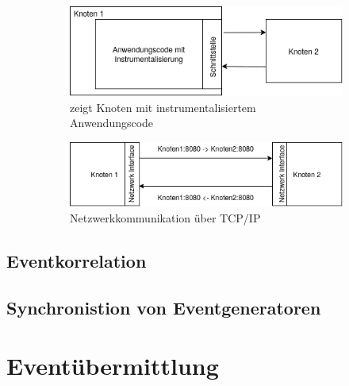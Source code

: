 \begin{figure}[!ht]
	\centering
	\begin{subfigure}[t]{.49\linewidth}
		\centering\includegraphics[width=0.9\linewidth]{img/synchronisation/distributed_system_application_inside.png}
		\caption[Abbildung]{zeigt Knoten mit instrumentalisiertem Anwendungscode}
		\label{fig:distributed_system_application_inside}
	\end{subfigure}
	\begin{subfigure}[t]{.49\linewidth}
		\centering\includegraphics[width=\linewidth]{img/synchronisation/distributed_system_network.png}
		\caption[Abbildung]{Netzwerkkommunikation über TCP/IP}
		\label{fig:distributed_system_network}
	\end{subfigure}
	\caption[Anwendungsinstrumentalisierung und Netzwerkkommunikation über TCP/IP in verteilten Systemen]{}
\end{figure} 

\subsection{Eventkorrelation}
\label{subsection:Eventkorrelation}
\subsection{Synchronistion von Eventgeneratoren}
\label{subsection:Synchronistion von Eventgeneratoren}
\section{Eventübermittlung}
\label{section:Eventübermittlung}

